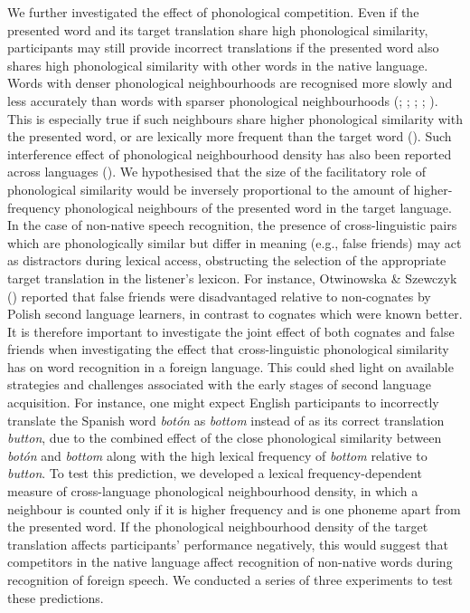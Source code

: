 \documentclass[
]{article}
\begin{document}
We further investigated the effect of phonological competition. Even if
the presented word and its target translation share high phonological
similarity, participants may still provide incorrect translations if the
presented word also shares high phonological similarity with other words
in the native language. Words with denser phonological neighbourhoods
are recognised more slowly and less accurately than words with sparser
phonological neighbourhoods (; ; ; ;
). This is
especially true if such neighbours share higher phonological similarity
with the presented word, or are lexically more frequent than the target
word (). Such
interference effect of phonological neighbourhood density has also been
reported across languages (). We hypothesised that the size of the facilitatory role
of phonological similarity would be inversely proportional to the amount
of higher-frequency phonological neighbours of the presented word in the
target language. In the case of non-native speech recognition, the
presence of cross-linguistic pairs which are phonologically similar but
differ in meaning (e.g., false friends) may act as distractors during
lexical access, obstructing the selection of the appropriate target
translation in the listener's lexicon. For instance, Otwinowska \&
Szewczyk () reported that false
friends were disadvantaged relative to non-cognates by Polish second
language learners, in contrast to cognates which were known better. It
is therefore important to investigate the joint effect of both cognates
and false friends when investigating the effect that cross-linguistic
phonological similarity has on word recognition in a foreign language.
This could shed light on available strategies and challenges associated
with the early stages of second language acquisition. For instance, one
might expect English participants to incorrectly translate the Spanish
word \emph{botón} as \emph{bottom} instead of as its correct translation
\emph{button}, due to the combined effect of the close phonological
similarity between \emph{botón} and \emph{bottom} along with the high
lexical frequency of \emph{bottom} relative to \emph{button}. To test
this prediction, we developed a lexical frequency-dependent measure of
cross-language phonological neighbourhood density, in which a neighbour
is counted only if it is higher frequency and is one phoneme apart from
the presented word. If the phonological neighbourhood density of the
target translation affects participants' performance negatively, this
would suggest that competitors in the native language affect recognition
of non-native words during recognition of foreign speech. We conducted a
series of three experiments to test these predictions.
\end{document}
